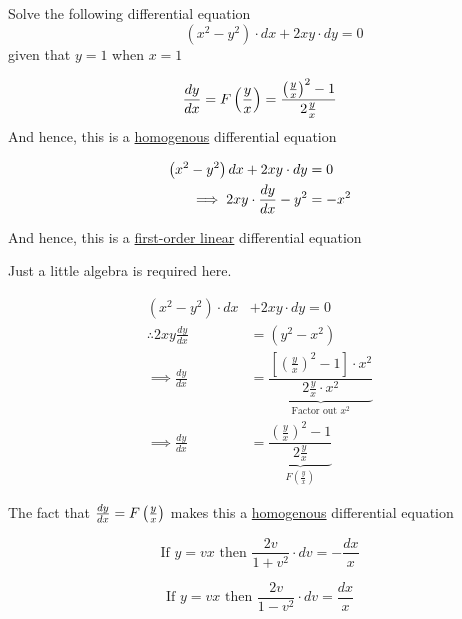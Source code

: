 \documentclass[14pt,fleqn]{extarticle}
\begin{document}
\begin{problem}
\statement
	
Solve the following differential equation 
\[ \qquad (x^2-y^2)\cdot dx +2xy\cdot dy = 0 \]
given that $y=1$ when $x=1$
%
\begin{step}
	\begin{options}
		\correct

		\[\frac{dy}{dx} = F\left( \frac{y}{x}\right) = \dfrac{\left(\frac{y}{x}\right)^2 - 1}{2\frac{y}{x}} \]
		And hence, this is a \underline{homogenous} differential equation

		\incorrect
		
		\begin{align}
		\left(x^2-y^2 \right) dx + 2xy\cdot dy &= 0  \\
		\implies 2xy\cdot\frac{dy}{dx} - y^2 &= -x^2 
\end{align}

And hence, this is a \underline{first-order linear} differential equation

	\end{options}
	\reason

Just a little algebra is required here. 

%
\begin{align}
(x^2-y^2)\cdot dx &+2xy\cdot dy = 0 \\
\therefore 2xy\frac{dy}{dx} &= (y^2-x^2)  \\ 
\implies \frac{dy}{dx} &= \underbrace{\dfrac{\left[\left( \frac{y}{x}\right)^2 - 1\right]\cdot x^2}{2\frac{y}{x}\cdot x^2}}_{\text{Factor out $x^2$}}\\
\implies \frac{dy}{dx} &= 
\underbrace{\dfrac{\left(\frac{y}{x}\right)^2 - 1}{2\frac{y}{x}}}_{F\left( \frac{y}{x}\right)}
\end{align}

The fact that $\frac{dy}{dx} = F \left(\frac{y}{x} \right)$ makes this a 
\underline{homogenous} differential equation

\end{step}
\begin{step}
	\begin{options}
		\correct

		\[\text{If } y = vx\text{ then } \frac{2v}{1+v^2}\cdot dv = -\frac{dx}{x}\]

		\incorrect

		\[\text{If } y = vx\text{ then }\frac{2v}{1- v^2}\cdot dv = \frac{dx}{x}\]

	\end{options}
	\reason


\end{step}
\end{problem}
\end{document}
